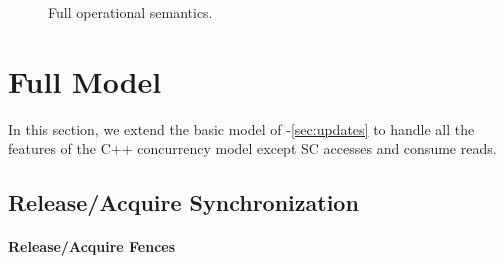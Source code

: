 {\begin{figure*}[t]
\caption{Full operational semantics.}
\label{fig:full-opsem-a}
\end{figure*}}


\section{Full Model}
\label{sec:full}

In this section, we extend the basic model of
-\ref{sec:updates} to handle all the
features of the C++ concurrency model except SC accesses and consume reads.


\subsection{Release/Acquire Synchronization}
\label{sec:relacq}

\paragraph{Release/Acquire Fences}

